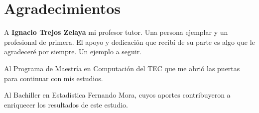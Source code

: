 \section*{Agradecimientos}
A \textbf{Ignacio Trejos Zelaya} mi profesor tutor. Una persona ejemplar y un profesional de primera. El apoyo y dedicación que recibí de su parte es algo que le agradeceré por siempre. Un ejemplo a seguir.


Al Programa de Maestría en Computación del TEC que me abrió las puertas para continuar con mis estudios.

Al Bachiller en Estadística Fernando Mora, cuyos aportes contribuyeron a enriquecer los resultados de este estudio.


\newpage